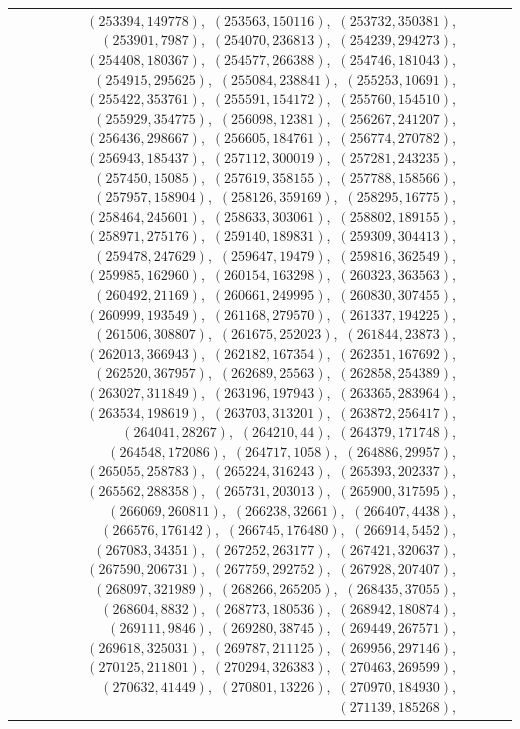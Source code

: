\documentclass[11pt]{article}
\begin{document}
\begin{longtable}{@{}rrl>{\raggedright\arraybackslash}p{}@{}}
$(253394,149778)$,\allowbreak\ $(253563,150116)$,\allowbreak\ $(253732,350381)$,\allowbreak\ $(253901,7987)$,\allowbreak\ $(254070,236813)$,\allowbreak\ $(254239,294273)$,\allowbreak\ $(254408,180367)$,\allowbreak\ $(254577,266388)$,\allowbreak\ $(254746,181043)$,\allowbreak\ $(254915,295625)$,\allowbreak\ $(255084,238841)$,\allowbreak\ $(255253,10691)$,\allowbreak\ $(255422,353761)$,\allowbreak\ $(255591,154172)$,\allowbreak\ $(255760,154510)$,\allowbreak\ $(255929,354775)$,\allowbreak\ $(256098,12381)$,\allowbreak\ $(256267,241207)$,\allowbreak\ $(256436,298667)$,\allowbreak\ $(256605,184761)$,\allowbreak\ $(256774,270782)$,\allowbreak\ $(256943,185437)$,\allowbreak\ $(257112,300019)$,\allowbreak\ $(257281,243235)$,\allowbreak\ $(257450,15085)$,\allowbreak\ $(257619,358155)$,\allowbreak\ $(257788,158566)$,\allowbreak\ $(257957,158904)$,\allowbreak\ $(258126,359169)$,\allowbreak\ $(258295,16775)$,\allowbreak\ $(258464,245601)$,\allowbreak\ $(258633,303061)$,\allowbreak\ $(258802,189155)$,\allowbreak\ $(258971,275176)$,\allowbreak\ $(259140,189831)$,\allowbreak\ $(259309,304413)$,\allowbreak\ $(259478,247629)$,\allowbreak\ $(259647,19479)$,\allowbreak\ $(259816,362549)$,\allowbreak\ $(259985,162960)$,\allowbreak\ $(260154,163298)$,\allowbreak\ $(260323,363563)$,\allowbreak\ $(260492,21169)$,\allowbreak\ $(260661,249995)$,\allowbreak\ $(260830,307455)$,\allowbreak\ $(260999,193549)$,\allowbreak\ $(261168,279570)$,\allowbreak\ $(261337,194225)$,\allowbreak\ $(261506,308807)$,\allowbreak\ $(261675,252023)$,\allowbreak\ $(261844,23873)$,\allowbreak\ $(262013,366943)$,\allowbreak\ $(262182,167354)$,\allowbreak\ $(262351,167692)$,\allowbreak\ $(262520,367957)$,\allowbreak\ $(262689,25563)$,\allowbreak\ $(262858,254389)$,\allowbreak\ $(263027,311849)$,\allowbreak\ $(263196,197943)$,\allowbreak\ $(263365,283964)$,\allowbreak\ $(263534,198619)$,\allowbreak\ $(263703,313201)$,\allowbreak\ $(263872,256417)$,\allowbreak\ $(264041,28267)$,\allowbreak\ $(264210,44)$,\allowbreak\ $(264379,171748)$,\allowbreak\ $(264548,172086)$,\allowbreak\ $(264717,1058)$,\allowbreak\ $(264886,29957)$,\allowbreak\ $(265055,258783)$,\allowbreak\ $(265224,316243)$,\allowbreak\ $(265393,202337)$,\allowbreak\ $(265562,288358)$,\allowbreak\ $(265731,203013)$,\allowbreak\ $(265900,317595)$,\allowbreak\ $(266069,260811)$,\allowbreak\ $(266238,32661)$,\allowbreak\ $(266407,4438)$,\allowbreak\ $(266576,176142)$,\allowbreak\ $(266745,176480)$,\allowbreak\ $(266914,5452)$,\allowbreak\ $(267083,34351)$,\allowbreak\ $(267252,263177)$,\allowbreak\ $(267421,320637)$,\allowbreak\ $(267590,206731)$,\allowbreak\ $(267759,292752)$,\allowbreak\ $(267928,207407)$,\allowbreak\ $(268097,321989)$,\allowbreak\ $(268266,265205)$,\allowbreak\ $(268435,37055)$,\allowbreak\ $(268604,8832)$,\allowbreak\ $(268773,180536)$,\allowbreak\ $(268942,180874)$,\allowbreak\ $(269111,9846)$,\allowbreak\ $(269280,38745)$,\allowbreak\ $(269449,267571)$,\allowbreak\ $(269618,325031)$,\allowbreak\ $(269787,211125)$,\allowbreak\ $(269956,297146)$,\allowbreak\ $(270125,211801)$,\allowbreak\ $(270294,326383)$,\allowbreak\ $(270463,269599)$,\allowbreak\ $(270632,41449)$,\allowbreak\ $(270801,13226)$,\allowbreak\ $(270970,184930)$,\allowbreak\ $(271139,185268)$,\allowbreak\ 
\end{longtable}
\end{document}
